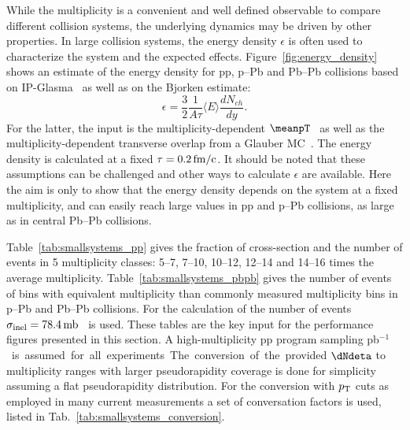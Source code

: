 \documentclass[../report.tex]{subfiles}
\begin{document}
While the multiplicity is a convenient and well defined observable to compare different collision systems, the underlying dynamics may be driven by other properties. In large collision systems, the energy density $\epsilon$ is often used to characterize the system and the expected effects. Figure~\ref{fig:energy_density} shows an estimate of the energy density for pp, p--Pb and Pb--Pb collisions based on IP-Glasma~\cite{McLerran:2013una,SchenkePriv1} as well as on the Bjorken estimate:
\begin{equation}
  \epsilon = \frac{3}{2} \frac{1}{A \tau} \langle E \rangle \frac{dN_{ch}}{dy}.
\end{equation}
For the latter, the input is the multiplicity-dependent $\meanpT$~\cite{Abelev:2013bla,Acharya:2018njl} as well as the multiplicity-dependent transverse overlap from a Glauber MC~\cite{Loizides:2017ack}. The energy density is calculated at a fixed $\tau = \unit[0.2]{fm/c}$. It should be noted that these assumptions can be challenged and other ways to calculate $\epsilon$ are available. Here the aim is only to show that the energy density depends on the system at a fixed multiplicity, and can easily reach large values in pp and p--Pb collisions, as large as in central Pb--Pb collisions.

Table~\ref{tab:smallsystems_pp} gives the fraction of cross-section and the number of events in 5 multiplicity classes:  5--7, 7--10, 10--12, 12--14 and 14--16 times the average multiplicity. Table~\ref{tab:smallsystems_pbpb} gives the number of events of bins with equivalent multiplicity than commonly measured multiplicity bins in p--Pb and Pb--Pb collisions. For the calculation of the number of events $\sigma_{\rm inel} = \unit[78.4]{mb}$~\cite{Loizides:2017ack} is used. These tables are the key input for the performance figures presented in this section. A high-multiplicity pp program sampling \unit[200]{pb$^{-1}$} is assumed for all experiments. 
The conversion of the provided $\dNdeta$ to multiplicity ranges with larger pseudorapidity coverage is done for simplicity assuming a flat pseudorapidity distribution. For the conversion with $p\sb{\scriptstyle\mathrm{T}}$ cuts as employed in many current measurements a set of conversation factors is used, listed in Tab.~\ref{tab:smallsystems_conversion}.
 
\end{document}
